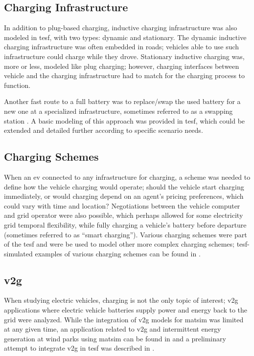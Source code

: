 \subsection{Charging Infrastructure}
In addition to plug-based charging, inductive charging infrastructure was also modeled in \gls{tesf}, with two types: dynamic and stationary. The dynamic inductive charging infrastructure was often embedded in roads; vehicles able to use such infrastructure could charge while they drove. Stationary inductive charging was, more or less, modeled like plug charging; however, charging interfaces between vehicle and the charging infrastructure had to match for the charging process to function.

Another fast route to a full battery was to replace/swap the used battery for a new one at a specialized infrastructure, sometimes referred to as a swapping station \citep[][]{LiEtAl_ACC_2011}. A basic modeling of this approach was provided in \gls{tesf}, which could be extended and detailed further according to specific scenario needs.

\subsection{Charging Schemes}
When an \gls{ev} connected to any infrastructure for charging, a scheme was needed to define how the vehicle charging would operate; should the vehicle start charging immediately, or would charging depend on an agent's pricing preferences, which could vary with time and location? Negotiations between the vehicle computer and grid operator were also possible, which perhaps allowed for some electricity grid temporal flexibility, while fully charging a vehicle's battery before departure (sometimes referred to as ``smart charging''). Various charging schemes were part of the \gls{tesf} and were be used to model other more complex charging schemes; \gls{tesf}-simulated examples of various charging schemes can be found in \citet[][]{WaraichEtAl_TRR_2013}.

\subsection{\protect\gls{v2g}}
When studying electric vehicles, charging is not the only topic of interest; \gls{v2g} applications where electric vehicle batteries supply power and energy back to the grid \citep[][]{KemptonTomic_JPS_2005} were analyzed. While the integration of \gls{v2g} models for \gls{matsim} was limited at any given time, an application related to \gls{v2g} and intermittent energy generation at wind parks using \gls{matsim} can be found in \citet[][]{GalusAndersson_CIGRE_2011} and a preliminary attempt to integrate \gls{v2g} in \gls{tesf} was described in \citet[][]{WaraichEtAl_JanssensEtAl_2014, Schieffer_MastersThesis_2011}.

